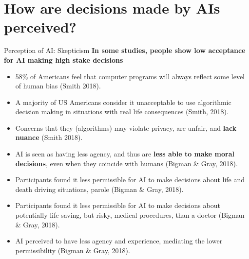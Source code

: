 \documentclass[8pt]{beamer}
\begin{document}
	\section{How are decisions made by AIs perceived?}

	\begin{frame}[t]{Perception of AI: Skepticism}
		\textbf{In some studies, people show low acceptance for AI making high stake decisions}
		\begin{itemize}
			\item 58\% of Americans feel that computer programs will always reflect some level of human bias (Smith 2018).
			\item A majority of US Americans consider it unacceptable to use algorithmic decision making in situations with real life consequences (Smith, 2018).
			\item Concerns that they (algorithms) may violate privacy, are unfair, and \textbf{lack nuance} (Smith 2018).
			\item <2> AI is seen as having less agency, and thus are \textbf{less able to make moral decisions}, even when they coincide with humans (Bigman \& Gray, 2018).
			\item <2> Participants found it less permissible for AI to make decisions about life and death driving situations, parole (Bigman \& Gray, 2018).
			\item <2> Participants found it less permissible for AI to make decisions about potentially life-saving, but risky, medical procedures, than a doctor (Bigman \& Gray, 2018).
			\item <2> AI perceived to have less agency and experience, mediating the lower permissibility (Bigman \& Gray, 2018).
		\end{itemize}
		\vspace{-3.5cm}
		\centering
	\end{frame}
\end{document}

